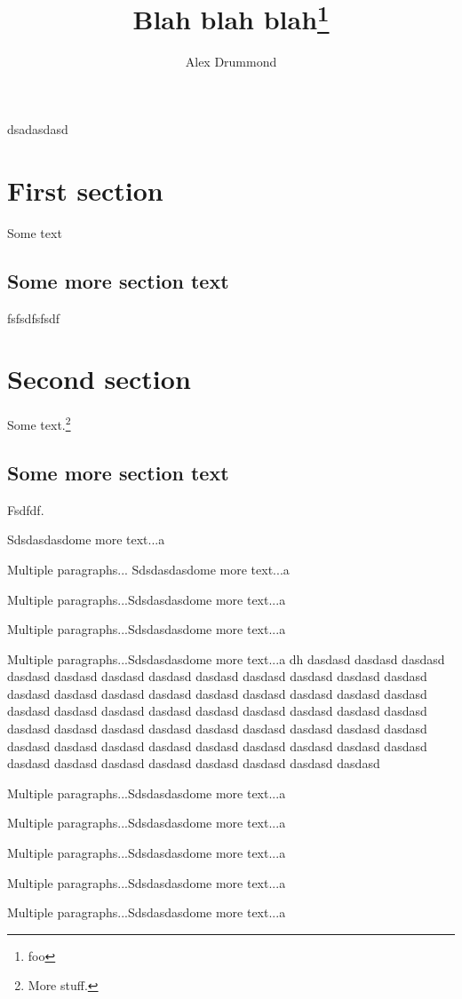 \documentclass[doublespace,endnotes]{lingpaper}
\author{Alex Drummond}
\title{Blah blah blah\thanks{foo}}
\begin{document}
\maketitle

\noindent
dsadasdasd

\section{First section}
Some text

\subsection{Some more section text}
fsfsdfsfsdf

\section{Second section}
Some text.\footnote{More stuff.}

\subsection{Some more section text}
Fsdfdf.

Sdsdasdasdome more text...a

Multiple paragraphs...
Sdsdasdasdome more text...a

Multiple paragraphs...Sdsdasdasdome more text...a

Multiple paragraphs...Sdsdasdasdome more text...a

Multiple paragraphs...Sdsdasdasdome more text...a dh dasdasd dasdasd dasdasd dasdasd dasdasd dasdasd dasdasd dasdasd dasdasd dasdasd dasdasd dasdasd dasdasd dasdasd dasdasd dasdasd dasdasd dasdasd dasdasd dasdasd dasdasd dasdasd dasdasd dasdasd dasdasd dasdasd dasdasd dasdasd dasdasd dasdasd dasdasd dasdasd dasdasd dasdasd dasdasd dasdasd dasdasd dasdasd dasdasd dasdasd dasdasd dasdasd dasdasd dasdasd dasdasd dasdasd dasdasd dasdasd dasdasd dasdasd dasdasd dasdasd dasdasd dasdasd dasdasd dasdasd 

Multiple paragraphs...Sdsdasdasdome more text...a

Multiple paragraphs...Sdsdasdasdome more text...a

Multiple paragraphs...Sdsdasdasdome more text...a

Multiple paragraphs...Sdsdasdasdome more text...a

Multiple paragraphs...Sdsdasdasdome more text...a
\end{document}
